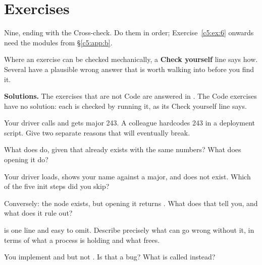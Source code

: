 
\section{Exercises}
\label{c5:sec:exercises}\label{c5:app:c}

\begin{aside}
Nine, ending with the Cross-check. Do them in order; Exercise~\ref{c5:ex:6} onwards need the modules
from \S\ref{c5:app:b}.

Where an exercise can be checked mechanically, a \textbf{Check yourself} line says how. Several have
a plausible wrong answer that is worth walking into before you find it.

\textbf{Solutions.} The exercises that are not Code are answered in . The Code
exercises have no solution: each is checked by running it, as its Check yourself line says.
\end{aside}

\label{c5:ex:1}

 Your driver calls  and gets major 243. A colleague hardcodes 243
in a deployment script. Give two separate reasons that will eventually break.

 What does  do, given that  already
exists with the same numbers? What does opening it do?

 Your driver loads,  shows your name against a major, and
 does not exist. Which of the five init steps did you skip?

 Conversely: the node exists, but opening it returns . What does that tell you,
and what does it rule out?

\label{c5:ex:2}

  is one line and easy to omit. Describe precisely what can go
wrong without it, in terms of what a process is holding and what  frees.

 You implement  and  but not . Is that a bug? What
is called instead?

